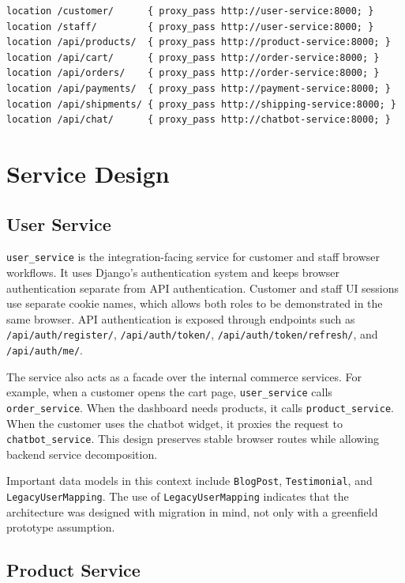 \documentclass[12pt,a4paper]{article}
\begin{document}
\begin{lstlisting}[caption={Simplified Nginx gateway routing concept.}]
location /customer/      { proxy_pass http://user-service:8000; }
location /staff/         { proxy_pass http://user-service:8000; }
location /api/products/  { proxy_pass http://product-service:8000; }
location /api/cart/      { proxy_pass http://order-service:8000; }
location /api/orders/    { proxy_pass http://order-service:8000; }
location /api/payments/  { proxy_pass http://payment-service:8000; }
location /api/shipments/ { proxy_pass http://shipping-service:8000; }
location /api/chat/      { proxy_pass http://chatbot-service:8000; }
\end{lstlisting}

\section{Service Design}

\subsection{User Service}

\texttt{user\_service} is the integration-facing service for customer and staff browser workflows. It uses Django's authentication system and keeps browser authentication separate from API authentication. Customer and staff UI sessions use separate cookie names, which allows both roles to be demonstrated in the same browser. API authentication is exposed through endpoints such as \texttt{/api/auth/register/}, \texttt{/api/auth/token/}, \texttt{/api/auth/token/refresh/}, and \texttt{/api/auth/me/}.

The service also acts as a facade over the internal commerce services. For example, when a customer opens the cart page, \texttt{user\_service} calls \texttt{order\_service}. When the dashboard needs products, it calls \texttt{product\_service}. When the customer uses the chatbot widget, it proxies the request to \texttt{chatbot\_service}. This design preserves stable browser routes while allowing backend service decomposition.

Important data models in this context include \texttt{BlogPost}, \texttt{Testimonial}, and \texttt{LegacyUserMapping}. The use of \texttt{LegacyUserMapping} indicates that the architecture was designed with migration in mind, not only with a greenfield prototype assumption.

\subsection{Product Service}
\end{document}
